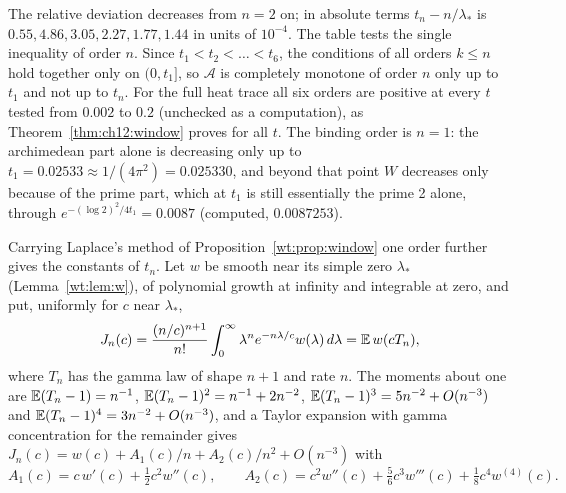 \begin{table}[h]\centering\small
{}
\caption{The first sign change $t_n$ of $(-1)^n\mathcal A^{(n)}$ against $n/\lambda_*$, $\lambda_*=r_*^2=39.5620$ (computed).}\label{wt:tab:window}
\end{table}

The relative deviation decreases from $n=2$ on; in absolute terms $t_n-n/\lambda_*$ is $0.55,4.86,3.05,2.27,1.77,1.44$ in units of $10^{-4}$. The table tests the single inequality of order $n$. Since $t_1<t_2<\dots<t_6$, the conditions of all orders $k\le n$ hold together only on $(0,t_1]$, so $\mathcal A$ is completely monotone of order $n$ only up to $t_1$ and not up to $t_n$. For the full heat trace all six orders are positive at every $t$ tested from $0.002$ to $0.2$ (unchecked as a computation), as Theorem~\ref{thm:ch12:window} proves for all $t$. The binding order is $n=1$: the archimedean part alone is decreasing only up to $t_1=0.02533\approx1/(4\pi^2)=0.025330$, and beyond that point $W$ decreases only because of the prime part, which at $t_1$ is still essentially the prime 2 alone, through $e^{-(\log2)^2/4t_1}=0.0087$ (computed, $0.0087253$).

Carrying Laplace's method of Proposition~\ref{wt:prop:window} one order further gives the constants of $t_n$. Let $w$ be smooth near its simple zero $\lambda_*$ (Lemma~\ref{wt:lem:w}), of polynomial growth at infinity and integrable at zero, and put, uniformly for $c$ near $\lambda_*$,
\[
J_n(c)=\frac{(n/c)^{n+1}}{n!}\int_0^\infty\lambda^ne^{-n\lambda/c}w(\lambda)\,d\lambda=\mathbb{E}\,w(cT_n),
\]
where $T_n$ has the gamma law of shape $n+1$ and rate $n$. The moments about one are $\mathbb{E}(T_n-1)=n^{-1}$, $\mathbb{E}(T_n-1)^2=n^{-1}+2n^{-2}$, $\mathbb{E}(T_n-1)^3=5n^{-2}+O(n^{-3})$ and $\mathbb{E}(T_n-1)^4=3n^{-2}+O(n^{-3})$, and a Taylor expansion with gamma concentration for the remainder gives $J_n(c)=w(c)+A_1(c)/n+A_2(c)/n^2+O(n^{-3})$ with
\[
A_1(c)=c\,w'(c)+\tfrac12c^2w''(c),\qquad A_2(c)=c^2w''(c)+\tfrac56c^3w'''(c)+\tfrac18c^4w^{(4)}(c).
\]


